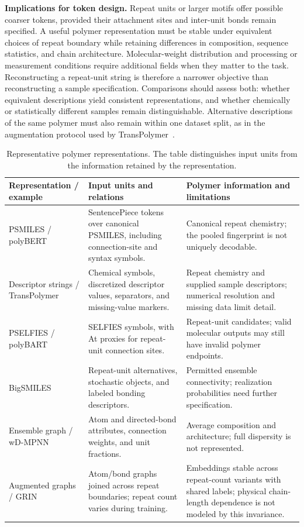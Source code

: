 \textbf{Implications for token design.}
Repeat units or larger motifs offer possible coarser tokens, provided their attachment sites and inter-unit bonds remain specified. A useful polymer representation must be stable under equivalent choices of repeat boundary while retaining differences in composition, sequence statistics, and chain architecture. Molecular-weight distribution and processing or measurement conditions require additional fields when they matter to the task. Reconstructing a repeat-unit string is therefore a narrower objective than reconstructing a sample specification. Comparisons should assess both: whether equivalent descriptions yield consistent representations, and whether chemically or statistically different samples remain distinguishable. Alternative descriptions of the same polymer must also remain within one dataset split, as in the augmentation protocol used by TransPolymer~\citep{xu2023transpolymer}.

\begin{table}[H]
\centering
\caption{Representative polymer representations. The table distinguishes input units from the information retained by the representation.}
\label{tab:polymer-tokenization}
\small
\setlength{\tabcolsep}{4pt}
\renewcommand{\arraystretch}{1.12}
\begin{tabularx}{\textwidth}{@{}L{0.20\textwidth}YY@{}}
\toprule
Representation / example & Input units and relations & Polymer information and limitations \\
\midrule
PSMILES / polyBERT~\citep{kuenneth2023polybert} & SentencePiece tokens over canonical PSMILES, including connection-site and syntax symbols. & Canonical repeat chemistry; the pooled fingerprint is not uniquely decodable. \\
Descriptor strings / TransPolymer~\citep{xu2023transpolymer} & Chemical symbols, discretized descriptor values, separators, and missing-value markers. & Repeat chemistry and supplied sample descriptors; numerical resolution and missing data limit detail. \\
PSELFIES / polyBART~\citep{savit2025polybart} & SELFIES symbols, with At proxies for repeat-unit connection sites. & Repeat-unit candidates; valid molecular outputs may still have invalid polymer endpoints. \\
BigSMILES~\citep{lin2019bigsmiles} & Repeat-unit alternatives, stochastic objects, and labeled bonding descriptors. & Permitted ensemble connectivity; realization probabilities need further specification. \\
Ensemble graph / wD-MPNN~\citep{aldeghi2022ensemble} & Atom and directed-bond attributes, connection weights, and unit fractions. & Average composition and architecture; full dispersity is not represented. \\
Augmented graphs / GRIN~\citep{zhu2025grin} & Atom/bond graphs joined across repeat boundaries; repeat count varies during training. & Embeddings stable across repeat-count variants with shared labels; physical chain-length dependence is not modeled by this invariance. \\
\bottomrule
\end{tabularx}
\end{table}

